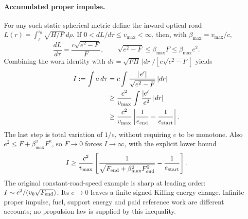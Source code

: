 \documentclass[10pt,twocolumn,letterpaper]{article}
\begin{document}
\paragraph{Accumulated proper impulse.}
For any such static spherical metric define the inward optical road
$L(r)=\int_r^{r_0}\sqrt{H/F}\,d\rho$. If
$0<dL/d\tau\leq v_{\max}<\infty$, then, with
$\beta_{\max}=v_{\max}/c$,
\begin{equation}
 \frac{dL}{d\tau}=\frac{c\sqrt{e^2-F}}F,\qquad
 \sqrt{e^2-F}\leq\beta_{\max}F\leq\beta_{\max}e^2.
 \label{eq:ch5-road-energy-bound}
\end{equation}
Combining the work identity with
$d\tau=\sqrt{FH}\,|dr|/[c\sqrt{e^2-F}]$ yields
\begin{align}
 I:=\int a\,d\tau
 &=c\int\frac{|e'|}{\sqrt{e^2-F}}\,|dr|\nonumber\\
 &\geq\frac{c^2}{v_{\max}}\int\frac{|e'|}{e^2}\,|dr|\nonumber\\
 &\geq\frac{c^2}{v_{\max}}
       \left|\frac1{e_{\rm end}}-\frac1{e_{\rm start}}\right|.
 \label{eq:ch5-sharp-impulse}
\end{align}
The last step is total variation of $1/e$, without requiring $e$ to be
monotone. Also $e^2\leq F+\beta_{\max}^2F^2$, so $F\to0$ forces
$I\to\infty$, with the explicit lower bound
\[
 I\geq\frac{c^2}{v_{\max}}\left[
 \frac1{\sqrt{F_{\rm end}+\beta_{\max}^2F_{\rm end}^2}}
 -\frac1{e_{\rm start}}\right].
\]
The original constant-road-speed example is sharp at leading order:
$I\sim c^2/(v_0\sqrt{F_{\rm end}})$. Its $e\to0$ leaves a finite
signed Killing-energy change. Infinite proper impulse, fuel, support
energy and paid reference work are different accounts; no propulsion
law is supplied by this inequality.
\end{document}
